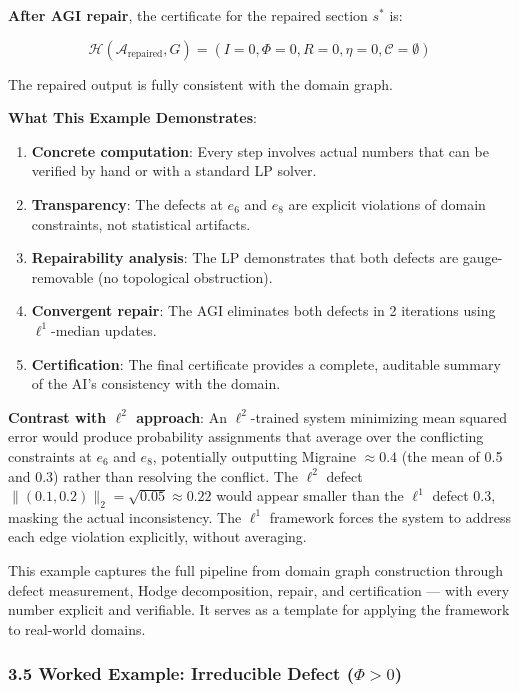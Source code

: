\documentclass[
]{article}
\providecommand{\tightlist}{%
  \setlength{\itemsep}{0pt}\setlength{\parskip}{0pt}}
\begin{document}
\textbf{After AGI repair}, the certificate for the repaired section
\(s^*\) is:

\[\mathcal{H}(\mathcal{A}_{\text{repaired}}, G) = (I=0, \Phi=0, R=0, \eta=0, \mathcal{C}=\emptyset)\]

The repaired output is fully consistent with the domain graph.

\textbf{What This Example Demonstrates}:

\begin{enumerate}
\def\labelenumi{\arabic{enumi}.}
\tightlist
\item
  \textbf{Concrete computation}: Every step involves actual numbers that
  can be verified by hand or with a standard LP solver.
\item
  \textbf{Transparency}: The defects at \(e_6\) and \(e_8\) are explicit
  violations of domain constraints, not statistical artifacts.
\item
  \textbf{Repairability analysis}: The LP demonstrates that both defects
  are gauge-removable (no topological obstruction).
\item
  \textbf{Convergent repair}: The AGI eliminates both defects in 2
  iterations using \(\ell^1\)-median updates.
\item
  \textbf{Certification}: The final certificate provides a complete,
  auditable summary of the AI's consistency with the domain.
\end{enumerate}

\textbf{Contrast with \(\ell^2\) approach}: An \(\ell^2\)-trained system
minimizing mean squared error would produce probability assignments that
average over the conflicting constraints at \(e_6\) and \(e_8\),
potentially outputting Migraine \(\approx 0.4\) (the mean of 0.5 and
0.3) rather than resolving the conflict. The \(\ell^2\) defect
\(\|(0.1, 0.2)\|_2 = \sqrt{0.05} \approx 0.22\) would appear smaller
than the \(\ell^1\) defect \(0.3\), masking the actual inconsistency.
The \(\ell^1\) framework forces the system to address each edge
violation explicitly, without averaging.

This example captures the full pipeline from domain graph construction
through defect measurement, Hodge decomposition, repair, and
certification --- with every number explicit and verifiable. It serves
as a template for applying the framework to real-world domains.

\subsubsection{\texorpdfstring{3.5 Worked Example: Irreducible Defect
(\(\Phi > 0\))}{3.5 Worked Example: Irreducible Defect (\textbackslash Phi \textgreater{} 0)}}\label{worked-example-irreducible-defect-phi-0}
\end{document}
